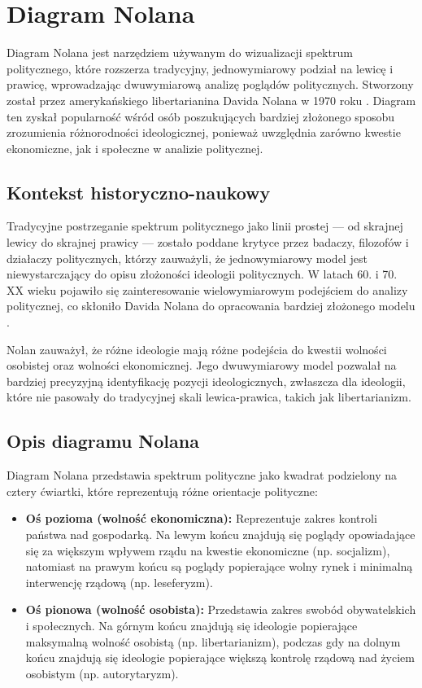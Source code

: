 \section{Diagram Nolana}
Diagram Nolana jest narzędziem używanym do wizualizacji spektrum politycznego, które rozszerza tradycyjny, jednowymiarowy podział na lewicę i prawicę, wprowadzając dwuwymiarową analizę poglądów politycznych.
Stworzony został przez amerykańskiego libertarianina Davida Nolana w 1970 roku \cite{Nolan1971}.
Diagram ten zyskał popularność wśród osób poszukujących bardziej złożonego sposobu zrozumienia różnorodności ideologicznej, ponieważ uwzględnia zarówno kwestie ekonomiczne, jak i społeczne w analizie politycznej.

\subsection{Kontekst historyczno-naukowy}
Tradycyjne postrzeganie spektrum politycznego jako linii prostej — od skrajnej lewicy do skrajnej prawicy — zostało poddane krytyce przez badaczy, filozofów i działaczy politycznych,
którzy zauważyli, że jednowymiarowy model jest niewystarczający do opisu złożoności ideologii politycznych.
W latach 60. i 70. XX wieku pojawiło się zainteresowanie wielowymiarowym podejściem do analizy politycznej, co skłoniło Davida Nolana do opracowania bardziej złożonego modelu \cite{Nolan1971}.

Nolan zauważył, że różne ideologie mają różne podejścia do kwestii wolności osobistej oraz wolności ekonomicznej.
Jego dwuwymiarowy model pozwalał na bardziej precyzyjną identyfikację pozycji ideologicznych, zwłaszcza dla ideologii, które nie pasowały do tradycyjnej skali lewica-prawica, takich jak libertarianizm.

\subsection{Opis diagramu Nolana}
Diagram Nolana przedstawia spektrum polityczne jako kwadrat podzielony na cztery ćwiartki, które reprezentują różne orientacje polityczne:

\begin{itemize}
      \item \textbf{Oś pozioma (wolność ekonomiczna):} Reprezentuje zakres kontroli państwa nad gospodarką.
            Na lewym końcu znajdują się poglądy opowiadające się za większym wpływem rządu na kwestie ekonomiczne (np. socjalizm),
            natomiast na prawym końcu są poglądy popierające wolny rynek i minimalną interwencję rządową (np. leseferyzm).
      \item \textbf{Oś pionowa (wolność osobista):} Przedstawia zakres swobód obywatelskich i społecznych.
            Na górnym końcu znajdują się ideologie popierające maksymalną wolność osobistą (np. libertarianizm),
            podczas gdy na dolnym końcu znajdują się ideologie popierające większą kontrolę rządową nad życiem osobistym (np. autorytaryzm).
\end{itemize}

